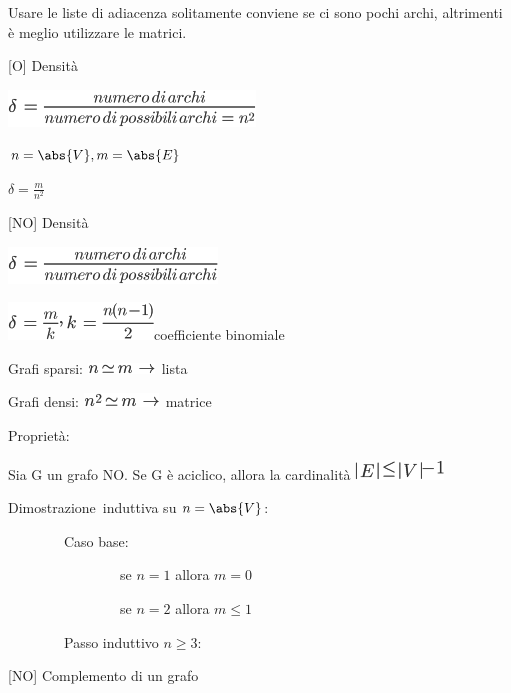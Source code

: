 \documentclass{article}
\begin{document}
{{}

{}

{Usare le liste di adiacenza solitamente conviene se ci sono pochi
archi, altrimenti è meglio utilizzare le matrici.}

{}

{{[}O{]} Densità}

\includegraphics{images/image391.png}

$n=\abs{V},m=\abs{E}$

$\delta=\frac{m}{n^2}$

{{[}NO{]} Densità}

\includegraphics{images/image393.png}

\includegraphics{images/image394.png}{coefficiente binomiale}

{}

{Grafi sparsi: }\includegraphics{images/image395.png}{~}{lista}

{Grafi densi: }\includegraphics{images/image396.png}{~matrice}

{}

{Proprietà}{:}

{Sia G un grafo NO. }{Se G è aciclico}{, allora la cardinalità
}\includegraphics{images/image397.png}

{Dimostrazione}{~induttiva su $n=\abs{V}$:}

{~~~~~~~~Caso base:}

{~~~~~~~~~~~~~~~~se $n=1$ allora $m = 0$

{~~~~~~~~~~~~~~~~se $n=2$ allora $m \leq 1$

{~~~~~~~~Passo induttivo $n \geq 3$:}



{{[}NO{]} Complemento di un grafo}

}}}
\end{document}
